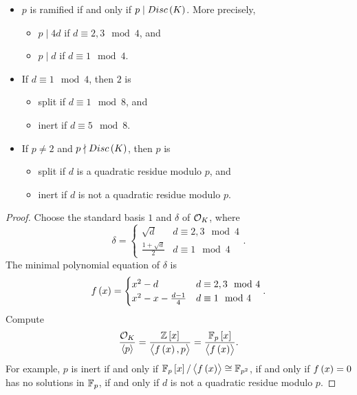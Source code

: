 
\begin{theorem}
\hfill
\begin{itemize}
\item $ p $ is ramified if and only if $ p \mid Disc\br{K} $. More precisely,
\begin{itemize}
\item $ p \mid 4d $ if $ d \equiv 2, 3 \mod 4 $, and
\item $ p \mid d $ if $ d \equiv 1 \mod 4 $.
\end{itemize}
\item If $ d \equiv 1 \mod 4 $, then $ 2 $ is
\begin{itemize}
\item split if $ d \equiv 1 \mod 8 $, and
\item inert if $ d \equiv 5 \mod 8 $.
\end{itemize}
\item If $ p \ne 2 $ and $ p \nmid Disc\br{K} $, then $ p $ is
\begin{itemize}
\item split if $ d $ is a quadratic residue modulo $ p $, and
\item inert if $ d $ is not a quadratic residue modulo $ p $.
\end{itemize}
\end{itemize}
\end{theorem}

\begin{proof}
Choose the standard basis $ 1 $ and $ \delta $ of $ \mathcal{O}_K $, where
$$ \delta =
\begin{cases}
\sqrt{d} & d \equiv 2, 3 \mod 4 \\
\tfrac{1 + \sqrt{d}}{2} & d \equiv 1 \mod 4
\end{cases}.
$$
The minimal polynomial equation of $ \delta $ is
$$ f\br{x} =
\begin{cases}
x^2 - d & d \equiv 2, 3 \mod 4 \\
x^2 - x - \tfrac{d - 1}{4} & d \equiv 1 \mod 4
\end{cases}.
$$
Compute
$$ \dfrac{\OO_K}{\abr{p}} = \dfrac{\Z\sbr{x}}{\abr{f\br{x}, p}} = \dfrac{\F_p\sbr{x}}{\abr{f\br{x}}}. $$
For example, $ p $ is inert if and only if $ \F_p\sbr{x} / \abr{f\br{x}} \cong \F_{p^2} $, if and only if $ f\br{x} = 0 $ has no solutions in $ \mathbb{F}_p $, if and only if $ d $ is not a quadratic residue modulo $ p $.
\end{proof}

